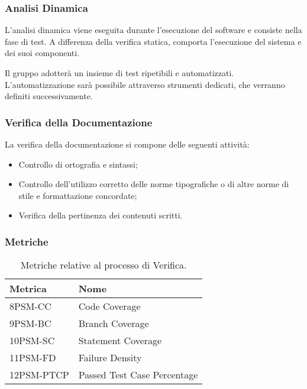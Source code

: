 \subsubsection*{Analisi Dinamica}
L’analisi dinamica viene eseguita durante l’esecuzione del software e consiste nella fase di test. A differenza della verifica statica, comporta l’esecuzione del sistema e dei suoi componenti.  

Il gruppo adotterà un insieme di test ripetibili e automatizzati. L’automatizzazione sarà possibile attraverso strumenti dedicati, che verranno definiti successivamente.

\subsubsection*{Verifica della Documentazione}
La verifica della documentazione si compone delle seguenti attività:
\begin{itemize}
    \item Controllo di ortografia e sintassi;
    \item Controllo dell’utilizzo corretto delle norme tipografiche o di altre norme di stile e formattazione concordate;
    \item Verifica della pertinenza dei contenuti scritti.
\end{itemize}


\subsubsection{Metriche}
\begin{table}[h!]
    \centering
    \renewcommand{\arraystretch}{1.5}
    \begin{tabular}{|l|l|}
        \hline
        \textbf{Metrica} & \textbf{Nome} \\
        \hline
        8PSM-CC & Code Coverage \\
        \hline
        9PSM-BC & Branch Coverage \\
        \hline
        10PSM-SC & Statement Coverage \\
        \hline
        11PSM-FD & Failure Density\\
        \hline
        12PSM-PTCP & Passed Test Case Percentage \\
        \hline
    \end{tabular}
    \caption{Metriche relative al processo di Verifica.}
\end{table}







